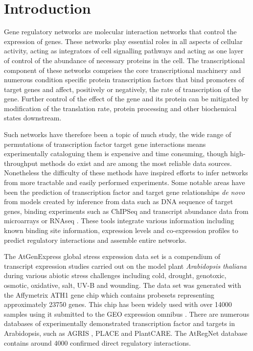 \documentclass[12pt,a4paper,]{article}
\begin{document}
\vskip 6.5pt


\noindent  \hypertarget{introduction}{%
\section{Introduction}\label{introduction}}

Gene regulatory networks are molecular interaction networks that control the expression of genes. These networks play essential roles in all aspects of cellular activity, acting as integrators of cell signalling pathways and acting as one layer of control of the abundance of necessary proteins in the cell. The transcriptional component of these networks comprises the core transcriptional machinery and numerous condition specific protein transcription factors that bind promoters of target genes and affect, positively or negatively, the rate of transcription of the gene. Further control of the effect of the gene and its protein can be mitigated by modification of the translation rate, protein processing and other biochemical states downstream.

Such networks have therefore been a topic of much study, the wide range of permutations of transcription factor target gene interactions means experimentally cataloguing them is expensive and time consuming, though high-throughput methods do exist and are among the most reliable data sources. Nonetheless the difficulty of these methods have inspired efforts to infer networks from more tractable and easily performed experiments. Some notable areas have been the prediction of transcription factor and target gene relationships \emph{de novo} from models created by inference from data such as DNA sequence of target genes, binding experiments such as ChIPSeq and transcript abundance data from microarrays or RNAseq \citep[\citet{friedmaninferring2004},\citet{buttediscoverin2000},\citet{liangreveal1998}]{willesparse2004}. These tools integrate various information including known binding site information, expression levels and co-expression profiles to predict regulatory interactions and assemble entire networks.

The AtGenExpress global stress expression data set \citep{kilianatgenexpress2007} is a compendium of transcript expression studies carried out on the model plant \emph{Arabidopsis thaliana} during various abiotic stress challenges including cold, drought, genotoxic, osmotic, oxidative, salt, UV-B and wounding. The data set was generated with the Affymetrix ATH1 gene chip \citep{redman2004} which contains probesets representing approximately 23750 genes. This chip has been widely used with over 14000 samples using it submitted to the GEO expression omnibus \citep{barrett2013}. There are numerous databases of experimentally demonstrated transcription factor and targets in Arabidopsis, such as AGRIS \citep{palaniswamy2006}, PLACE and PlantCARE. The AtRegNet database contains around 4000 confirmed direct regulatory interactions.
\end{document}
